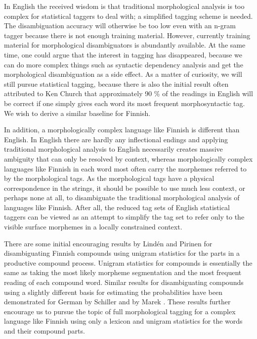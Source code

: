 \documentclass[postprint]{flammie}
\begin{document}
In English the received wisdom is that traditional morphological
analysis is too complex for statistical taggers to deal with; a
simplified tagging scheme is needed. The disambiguation accuracy will
otherwise be too low even with an n-gram tagger because there is not
enough training material. However, currently training material for
morphological disambiguators is abundantly available. At the same
time, one could argue that the interest in tagging has disappeared,
because we can do more complex things such as syntactic dependency
analysis and get the morphological disambiguation as a side effect. As
a matter of curiosity, we will still pursue statistical tagging,
because there is also the initial result often attributed to Ken
Church that approximately 90 \% of the readings in English will be
correct if one simply gives each word its most frequent
morphosyntactic tag. We wish to derive a similar baseline for Finnish.

In addition, a morphologically complex language like Finnish is
different than English. In English there are hardly any inflectional
endings and applying traditional morphological analysis to English
necessarily creates massive ambiguity that can only be resolved by
context, whereas morphologically complex languages like Finnish in
each word most often carry the morphemes referred to by the
morphological tags. As the morphological tags have a physical
correspondence in the strings, it should be possible to use much less
context, or perhaps none at all, to disambiguate the traditional
morphological analysis of languages like Finnish. After all, the
reduced tag sets of English statistical taggers can be viewed as an
attempt to simplify the tag set to refer only to the visible surface
morphemes in a locally constrained context.

There are some initial encouraging results by Lindén and Pirinen
\cite{linden09nodalida} for disambiguating Finnish compounds using
unigram statistics for the parts in a productive compound process.
Unigram statistics for compounds is essentially the same as taking the
most likely morpheme segmentation and the most frequent reading of
each compound word. Similar results for disambiguating compounds using
a slightly different basis for estimating the probabilities have been
demonstrated for German by Schiller \cite{schiller2005} and by Marek
\cite{marek2006}. These results further encourage us to pursue the
topic of full morphological tagging for a complex language like
Finnish using only a lexicon and unigram statistics for the words and
their compound parts.
\end{document}

